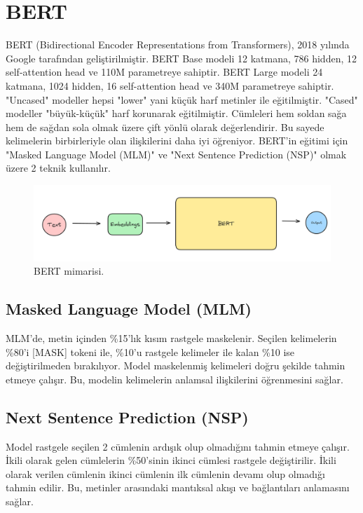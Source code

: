 \section{BERT}
BERT (Bidirectional Encoder Representations from Transformers), 2018 yılında Google tarafından geliştirilmiştir. BERT Base modeli 12 katmana, 786 hidden, 12 self-attention head ve 110M parametreye sahiptir. BERT Large modeli 24 katmana, 1024 hidden, 16 self-attention head ve 340M parametreye sahiptir. "Uncased" modeller hepsi "lower" yani küçük harf metinler ile eğitilmiştir. "Cased" modeller "büyük-küçük" harf korunarak eğitilmiştir. Cümleleri hem soldan sağa hem de sağdan sola olmak üzere çift yönlü olarak değerlendirir. Bu sayede kelimelerin birbirleriyle olan ilişkilerini daha iyi öğreniyor. BERT'in eğitimi için "Masked Language Model (MLM)" ve "Next Sentence Prediction (NSP)" olmak üzere 2 teknik kullanılır.

\begin{figure}[h]
    \centering
    \includegraphics[width=1\textwidth]{images/bert_architecture.png}
    \caption{BERT mimarisi.}
    \label{fig:enter-label}
\end{figure}

\subsection{Masked Language Model (MLM)}
MLM'de, metin içinden \%15'lık kısım rastgele maskelenir. Seçilen kelimelerin \%80'i [MASK] tokeni ile, \%10'u rastgele kelimeler ile kalan \%10 ise değiştirilmeden bırakılıyor. Model maskelenmiş kelimeleri doğru şekilde tahmin etmeye çalışır. Bu, modelin kelimelerin anlamsal ilişkilerini öğrenmesini sağlar. 

\subsection{Next Sentence Prediction (NSP)}
Model rastgele seçilen 2 cümlenin ardışık olup olmadığını tahmin etmeye çalışır. İkili olarak gelen cümlelerin \%50'sinin ikinci cümlesi rastgele değiştirilir. İkili olarak verilen cümlenin ikinci cümlenin ilk cümlenin devamı olup olmadığı tahmin edilir. Bu, metinler arasındaki mantıksal akışı ve bağlantıları anlamasını sağlar. 

